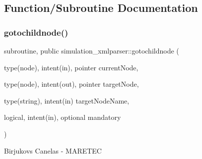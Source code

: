 \subsection{Function/\+Subroutine Documentation}
\mbox{\label{namespacesimulation__xmlparser_a9a66c3a491ca567688fef7148e2d12d8}} 
\subsubsection{\texorpdfstring{gotochildnode()}{gotochildnode()}}
{\footnotesize\ttfamily subroutine, public simulation\+\_\+xmlparser\+::gotochildnode (\begin{DoxyParamCaption}\item[{type(node), intent(in), pointer}]{current\+Node,  }\item[{type(node), intent(out), pointer}]{target\+Node,  }\item[{type(string), intent(in)}]{target\+Node\+Name,  }\item[{logical, intent(in), optional}]{mandatory }\end{DoxyParamCaption})}



Birjukovs Canelas -\/ M\+A\+R\+E\+T\+EC 

